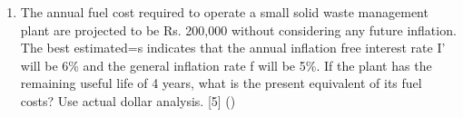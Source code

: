 \documentclass[12pt]{article}
\begin{document}
\begin{enumerate}
			\item The annual fuel cost required to operate a small solid waste management plant are projected to be Rs. 200,000 without considering any future inflation. The best estimated=s indicates that the annual inflation free interest rate I' will be 6\% and the general inflation rate f will be 5\%. If the plant has the remaining useful life of 4 years, what is the present equivalent of its fuel costs? Use actual dollar analysis. \hfill [5] ()

		\end{enumerate}
\end{document}

